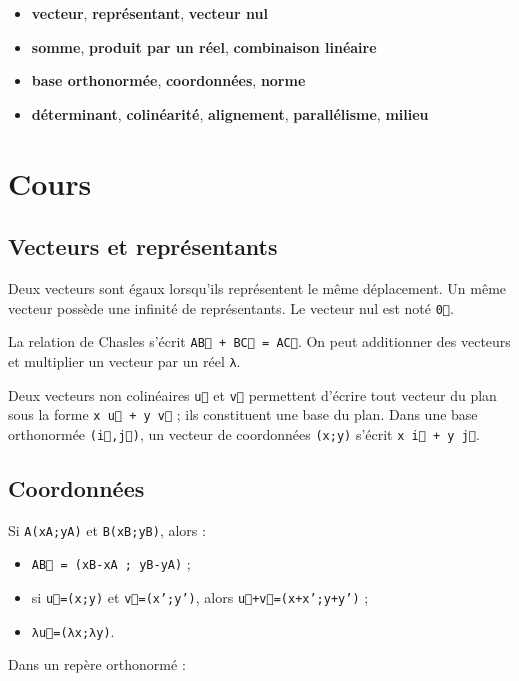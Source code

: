 \begin{itemize}
\item \textbf{vecteur}, \textbf{représentant}, \textbf{vecteur nul}
\item \textbf{somme}, \textbf{produit par un réel}, \textbf{combinaison linéaire}
\item \textbf{base orthonormée}, \textbf{coordonnées}, \textbf{norme}
\item \textbf{déterminant}, \textbf{colinéarité}, \textbf{alignement}, \textbf{parallélisme}, \textbf{milieu}
\end{itemize}

\section{Cours}

\subsection{Vecteurs et représentants}

Deux vecteurs sont égaux lorsqu'ils représentent le même déplacement. Un même vecteur possède une infinité de représentants. Le vecteur nul est noté \texttt{0⃗}.

La relation de Chasles s'écrit \texttt{AB⃗ + BC⃗ = AC⃗}. On peut additionner des vecteurs et multiplier un vecteur par un réel \texttt{λ}.

Deux vecteurs non colinéaires \texttt{u⃗} et \texttt{v⃗} permettent d'écrire tout vecteur du plan sous la forme \texttt{x u⃗ + y v⃗} ; ils constituent une base du plan. Dans une base orthonormée \texttt{(i⃗,j⃗)}, un vecteur de coordonnées \texttt{(x;y)} s'écrit \texttt{x i⃗ + y j⃗}.

\subsection{Coordonnées}

Si \texttt{A(xA;yA)} et \texttt{B(xB;yB)}, alors :

\begin{itemize}
\item \texttt{AB⃗ = (xB-xA ; yB-yA)} ;
\item si \texttt{u⃗=(x;y)} et \texttt{v⃗=(x';y')}, alors \texttt{u⃗+v⃗=(x+x';y+y')} ;
\item \texttt{λu⃗=(λx;λy)}.
\end{itemize}

Dans un repère orthonormé :

